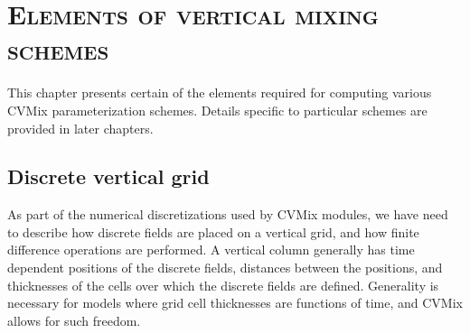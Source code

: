 \chapter{\scshape Elements of vertical mixing schemes}
\label{chapter:cvmix_elements}

\minitoc
\vspace{.5cm}

This chapter presents certain of the elements required for computing
various CVMix parameterization schemes.  Details specific to
particular schemes are provided in later chapters.

\section{Discrete vertical grid}
\label{section:vertical-grid-numerics}

As part of the numerical discretizations used by CVMix modules, we
have need to describe how discrete fields are placed on a vertical
grid, and how finite difference operations are performed.  A vertical
column generally has time dependent positions of the discrete fields,
distances between the positions, and thicknesses of the cells over
which the discrete fields are defined.  Generality is necessary for
models where grid cell thicknesses are functions of time, and CVMix
allows for such freedom.

